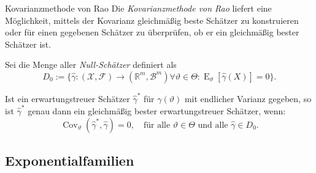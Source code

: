 \begin{defi}{Kovarianzmethode von Rao}
    Die \emph{Kovarianzmethode von Rao} liefert eine Möglichkeit, mittels der Kovarianz gleichmäßig beste Schätzer zu konstruieren oder für einen gegebenen Schätzer zu überprüfen, ob er ein gleichmäßig bester Schätzer ist.

    Sei die Menge aller \emph{Null-Schätzer} definiert als
    \[
        D_0 := \{ \hat{\gamma}: (\mathcal{X}, \mathcal{F}) \to (\mathbb{R}^m, \mathcal{B}^m) \forall \vartheta \in \Theta : \operatorname{E}_{\vartheta}[\hat{\gamma}(X)] = 0\}.
    \]

    Ist ein erwartungstreuer Schätzer $\hat{\gamma}^*$ für $\gamma(\vartheta)$ mit endlicher Varianz gegeben, so ist $\hat{\gamma}^*$ genau dann ein gleichmäßig bester erwartungstreuer Schätzer, wenn:
    \[
        \operatorname{Cov}_{\vartheta}(\hat{\gamma}^*, \hat{\gamma}) = 0, \quad \text{für alle } \vartheta \in \Theta \text{ und alle } \hat{\gamma} \in D_0.
    \]
\end{defi}

\subsection{Exponentialfamilien}

